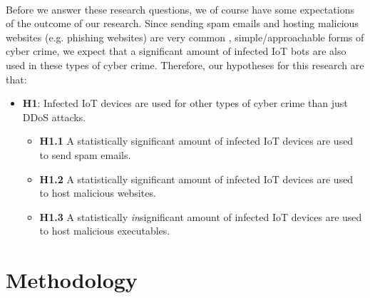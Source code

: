 \documentclass[a4paper,10pt]{article}
\begin{document}
~\\
Before we answer these research questions, we of course have some expectations of the outcome of our research.
Since sending spam emails and hosting malicious websites (e.g. phishing websites) are very common 
\cite{common_cyber_crime},  simple/approachable forms of cyber crime, we expect that a significant amount of 
infected IoT bots are also used in these types of cyber crime. Therefore, our hypotheses for this research are that:
\begin{itemize}
  \item[] \textbf{H1}: Infected IoT devices are used for other types of cyber crime than just DDoS attacks.
  \begin{itemize}
    \item[] \textbf{H1.1} A statistically significant amount of infected IoT devices are used to send spam emails.
    \item[] \textbf{H1.2} A statistically significant amount of infected IoT devices are used to host malicious websites.
    \item[] \textbf{H1.3} A statistically \textit{in}significant amount of infected IoT devices are used to host malicious 
    executables.
  \end{itemize}
\end{itemize}

\section{Methodology} \label{sec:methodology}
\end{document}
